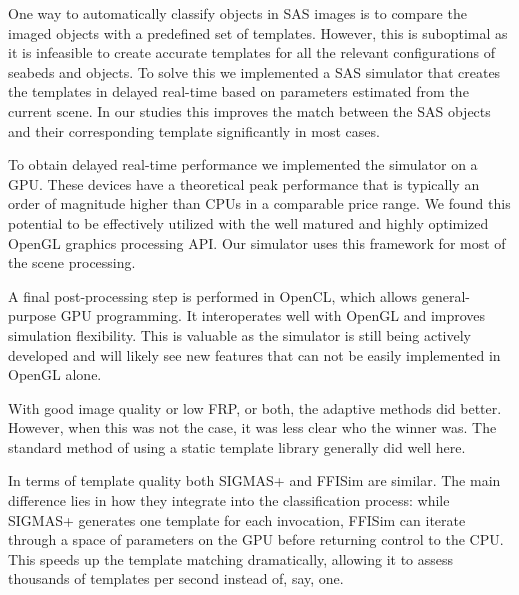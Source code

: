 
One way to automatically classify objects in SAS images is to compare the imaged objects with a predefined set of templates. However, this is suboptimal as it is infeasible to create accurate templates for all the relevant configurations of seabeds and objects. To solve this we implemented a SAS simulator that creates the templates in delayed real-time based on parameters estimated from the current scene. In our studies this improves the match between the SAS objects and their corresponding template significantly in most cases.

To obtain delayed real-time performance we implemented the simulator on a GPU. These devices have a theoretical peak performance that is typically an order of magnitude higher than CPUs in a comparable price range. We found this potential to be effectively utilized with the well matured and highly optimized OpenGL graphics processing API. Our simulator uses this framework for most of the scene processing.

A final post-processing step is performed in OpenCL, which allows general-purpose GPU programming. It interoperates well with OpenGL and improves simulation flexibility. This is valuable as the simulator is still being actively developed and will likely see new features that can not be easily implemented in OpenGL alone.

With good image quality or low FRP, or both, the adaptive methods did better. However, when this was not the case, it was less clear who the winner was. The standard method of using a static template library generally did well here.

In terms of template quality both SIGMAS+ and FFISim are similar. The main difference lies in how they integrate into the classification process: while SIGMAS+ generates one template for each invocation, FFISim can iterate through a space of parameters on the GPU before returning control to the CPU. This speeds up the template matching dramatically, allowing it to assess thousands of templates per second instead of, say, one. 
 
%

\ifPhdDoc
\clearpage
\appendix
\renewcommand\thesection{\Roman{section}}
\else
\appendices
\fi

